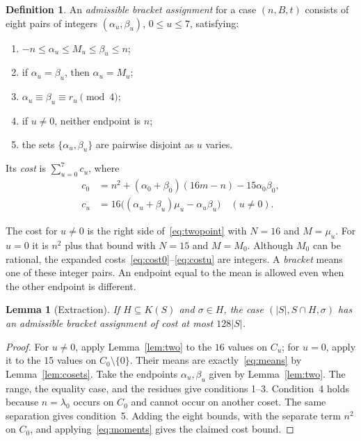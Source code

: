\documentclass[11pt]{article}
\newtheorem{lemma}[theorem]{Lemma}
\theoremstyle{definition}
\newtheorem{definition}[theorem]{Definition}
\begin{document}
\begin{definition}\label{def:brackets}
An \emph{admissible bracket assignment} for a case $(n,B,t)$ consists
of eight pairs of integers $(\alpha_u,\beta_u)$, $0\leq u\leq7$,
satisfying:
\begin{enumerate}
\item $-n\leq\alpha_u\leq M_u\leq\beta_u\leq n$;
\item if $\alpha_u=\beta_u$, then $\alpha_u=M_u$;
\item $\alpha_u\equiv\beta_u\equiv r_u\pmod4$;
\item if $u\ne0$, neither endpoint is $n$;
\item the sets $\{\alpha_u,\beta_u\}$ are pairwise disjoint as $u$ varies.
\end{enumerate}
Its \emph{cost} is $\sum_{u=0}^7c_u$, where
\begin{align}
 c_0&=n^2+(\alpha_0+\beta_0)(16m-n)-15\alpha_0\beta_0,
                                                        \label{eq:cost0}\\
 c_u&=16\bigl((\alpha_u+\beta_u)\mu_u-\alpha_u\beta_u\bigr)
                    \quad (u\ne0).                     \label{eq:costu}
\end{align}
\end{definition}

The cost for $u\ne0$ is the right side of~\eqref{eq:twopoint} with
$N=16$ and $M=\mu_u$. For $u=0$ it is $n^2$ plus that bound with
$N=15$ and $M=M_0$. Although $M_0$ can be rational, the expanded
costs~\eqref{eq:cost0}--\eqref{eq:costu} are integers.
A \emph{bracket} means one of these integer pairs. An endpoint equal to the
mean is allowed even when the other endpoint is different.

\begin{lemma}[Extraction]\label{lem:extraction}
If $H\subseteq K(S)$ and $\sigma\in H$, the case
$(|S|,S\cap H,\sigma)$ has an admissible bracket assignment of cost
at most $128|S|$.
\end{lemma}
\begin{proof}
For $u\ne0$, apply Lemma~\ref{lem:two} to the $16$ values on $C_u$;
for $u=0$, apply it to the $15$ values on $C_0\setminus\{0\}$.
Their means are exactly~\eqref{eq:means} by Lemma~\ref{lem:cosets}.
Take the endpoints $\alpha_u,\beta_u$ given by Lemma~\ref{lem:two}.
The range, the equality case, and the residues give conditions 1--3.
Condition~4 holds because $n=\lambda_0$ occurs on $C_0$ and cannot
occur on another coset. The same separation gives condition~5.
Adding the eight bounds, with the separate term $n^2$ on $C_0$,
and applying~\eqref{eq:moments} gives the claimed cost bound.
\end{proof}
\end{document}
